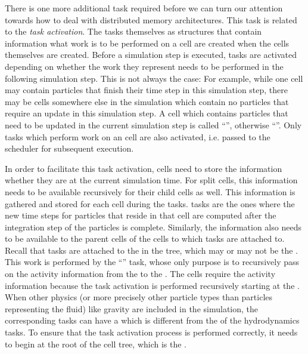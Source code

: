There is one more additional task required before we can turn our attention towards how to deal
with distributed memory architectures. This task is related to the \emph{task activation}. The
tasks themselves as structures that contain information what work is to be performed on a cell are
created when the cells themselves are created. Before a simulation step is executed, tasks are
activated depending on whether the work they represent needs to be performed in the following
simulation step. This is not always the case: For example, while one cell may contain particles
that finish their time step in this simulation step, there may be cells somewhere else in the
simulation which contain no particles that require an update in this simulation step. A cell which
contains particles that need to be updated in the current simulation step is called
``'', otherwise ``''. Only tasks which perform work on an
 cell are also activated, i.e. passed to the scheduler for subsequent execution.

In order to facilitate this task activation, cells need to store the information whether they
are  at the current simulation time. For split cells, this information needs to be
available recursively for their child cells as well. This information is gathered and stored for
each cell during the  tasks.  tasks are the ones where the new time
steps for particles that reside in that cell are computed after the integration step of the
particles is complete. Similarly, the information also needs to be available to the parent cells of
the cells to which tasks are attached to. Recall that tasks are attached to the 
in the tree, which may or may not be the . This work is performed by the
``'' task, whose only purpose is to recursively pass on the activity information
from the  to the . The  cells require the
activity information because the task activation is performed recursively starting at the
. When other physics (or more precisely other particle types than particles
representing the fluid) like gravity are included in the simulation, the corresponding tasks can
have a  which is different from the  of the hydrodynamics
tasks. To ensure that the task activation process is performed correctly, it needs to begin at the
root of the cell tree, which is the .




